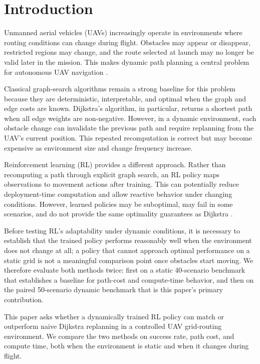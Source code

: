 \section{Introduction}

Unmanned aerial vehicles (UAVs) increasingly operate in environments where routing conditions can change during flight. Obstacles may appear or disappear, restricted regions may change, and the route selected at launch may no longer be valid later in the mission. This makes dynamic path planning a central problem for autonomous UAV navigation \cite{ghambari2024survey,johnson2026rcsr}.

Classical graph-search algorithms remain a strong baseline for this problem because they are deterministic, interpretable, and optimal when the graph and edge costs are known. Dijkstra's algorithm, in particular, returns a shortest path when all edge weights are non-negative. However, in a dynamic environment, each obstacle change can invalidate the previous path and require replanning from the UAV's current position. This repeated recomputation is correct but may become expensive as environment size and change frequency increase.

Reinforcement learning (RL) provides a different approach. Rather than recomputing a path through explicit graph search, an RL policy maps observations to movement actions after training. This can potentially reduce deployment-time computation and allow reactive behavior under changing conditions. However, learned policies may be suboptimal, may fail in some scenarios, and do not provide the same optimality guarantees as Dijkstra \cite{mannan2023classical,tu2023uav,guo2023uav}.

Before testing RL's adaptability under dynamic conditions, it is necessary to establish that the trained policy performs reasonably well when the environment does not change at all; a policy that cannot approach optimal performance on a static grid is not a meaningful comparison point once obstacles start moving. We therefore evaluate both methods twice: first on a static 40-scenario benchmark that establishes a baseline for path-cost and compute-time behavior, and then on the paired 50-scenario dynamic benchmark that is this paper's primary contribution.

This paper asks whether a dynamically trained RL policy can match or outperform naive Dijkstra replanning in a controlled UAV grid-routing environment. We compare the two methods on success rate, path cost, and compute time, both when the environment is static and when it changes during flight.

